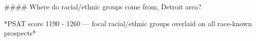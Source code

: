 #### Where do racial/ethnic groups come from, Detroit area?

*PSAT score 1190 - 1260 — focal racial/ethnic groups overlaid on all race-known prospects*

